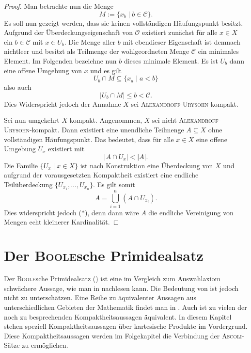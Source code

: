 \begin{proof}
  Man betrachte nun die Menge
  \begin{displaymath}
    M := \{ x_b \mid b \in \mathcal{C} \}.
  \end{displaymath}
  Es soll nun gezeigt werden, dass sie keinen vollständigen Häufungspunkt besitzt. 
  Aufgrund der Überdeckungseigenschaft von $\mathcal{O}$ existiert zunächst für alle $x \in X$ ein $b \in \mathcal{C}$ mit $x \in U_b$.
  Die Menge aller $b$ mit ebendieser Eigenschaft ist demnach nichtleer und besitzt als Teilmenge der wohlgeordneten Menge $\mathcal{C}$ ein minimales Element.
  Im Folgenden bezeichne nun $b$ dieses minimale Element.
  Es ist $U_b$ dann eine offene Umgebung von $x$ und es gilt 
  \begin{displaymath}
    U_b \cap M \subseteq \{x_a \mid a < b\}
  \end{displaymath}
  also auch
  \begin{displaymath}
    |U_b \cap M| \leq b < \mathcal{C}.
  \end{displaymath}
  Dies Widerspricht jedoch der Annahme $X$ sei \textsc{Alexandroff}\hyp{}\textsc{Urysohn}\hyp{}kompakt.

  Sei nun umgekehrt $X$ kompakt.
  Angenommen, $X$ sei nicht \textsc{Alexandroff}\hyp{}\textsc{Urysohn}\hyp{}kompakt.
  Dann existiert eine unendliche Teilmenge $A \subseteq X$ ohne vollständigen Häufungspunkt.
  Das bedeutet, dass für alle $x \in X$ eine offene Umgebung $U_x$ existiert mit
  \begin{displaymath}
    | A \cap U_x | < | A |. \tag{$\ast$}
  \end{displaymath}
  Die Familie $\{U_x \mid x \in X\}$ ist nach Konstruktion eine Überdeckung von $X$ und aufgrund der vorausgesetzten Kompaktheit existiert eine endliche Teilüberdeckung $\{U_{x_1},\dots,U_{x_n}\}$.
  Es gilt somit
  \begin{displaymath}
    A = \bigcup_{i = 1}^n (A \cap U_{x_i}).
  \end{displaymath}
  Dies widerspricht jedoch ($\ast$), denn dann wäre $A$ die endliche Vereinigung von Mengen echt kleinerer Kardinalität. 
\end{proof}

\section{Der \textsc{Boole}sche Primidealsatz}

Der \textsc{Boole}sche Primidealsatz (\PIT) ist eine im Vergleich zum Auswahlaxiom schwächere Aussage, wie man in \cite{halpern1971boolean} nachlesen kann.
Die Bedeutung von \PIT ist jedoch nicht zu unterschätzen. Eine Reihe zu \PIT äquivalenter Aussagen aus unterschiedlichen Gebieten der Mathematik findet man in \cite{dau1994diplom}.
Auch ist \PIT zu vielen der noch zu besprechenden Kompaktheitsaussagen äquivalent. 
In diesem Kapitel stehen speziell Kompaktheitsaussagen über kartesische Produkte im Vordergrund. 
Diese Kompaktheitsaussagen werden im Folgekapitel die Verbindung der \textsc{Ascoli}\hyp{}Sätze zu \PIT ermöglichen.

